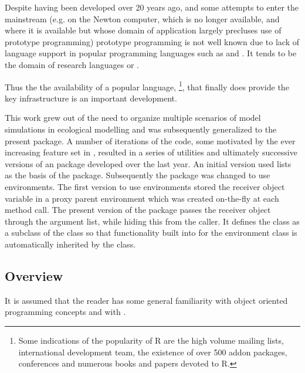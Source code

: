 \documentclass{Z}
\begin{document}
Despite having been developed over 20 years ago, and some attempts to
enter the mainstream (e.g.   
on the Newton computer, which
is no longer available, and  where 
it is available but whose
domain of application largely precluses use of prototype programming)
prototype programming is not well known due to lack of language
support in popular programming languages such as  and 
.  It tends
to be the domain of research languages or .

Thus the
the availability of a popular language,
 \footnote{Some indications of the popularity of R are
the high volume mailing lists, international development team, the
existence of over 500 addon packages, conferences and numerous books 
and papers devoted to R.},
that finally does provide the key infrastructure 
is an important development.

This work grew out of the need to organize multiple scenarios of model
simulations in ecological modelling \citep{Rnews:Petzoldt:2003} and
was subsequently generalized to the present package.  A number of
iterations of the code, some motivated by the ever increasing feature
set in , resulted in a series of utilities and ultimately
successive versions of an  package developed over the last
year.  An initial version used  lists as the basis of the
package.  Subsequently the package was changed to use 
environments.  The first version to use environments stored the
receiver object variable in a proxy parent environment which was
created on-the-fly at each method call.  The present version of
the  package passes the receiver object through the argument list,
while hiding this from the caller.  It defines the  class
as a subclass of the  class so that
functionality built into  for the environment class is
automatically inherited by the  class.

\subsection{Overview}
\label{sec:overview}

It is assumed that the reader has some general
familiarity with object oriented programming concepts and with
.
\end{document}
